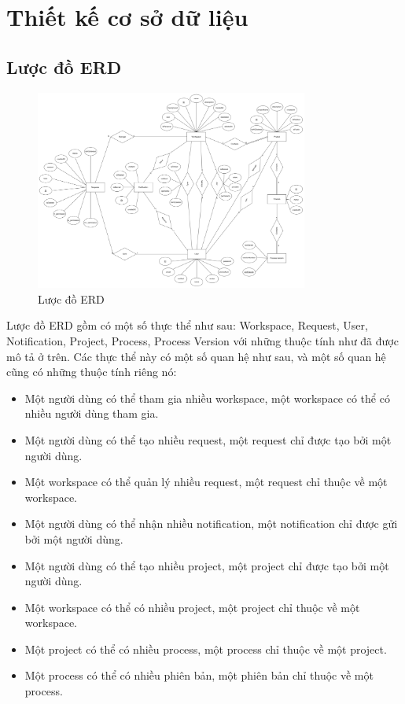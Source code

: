 \section{Thiết kế cơ sở dữ liệu}
\subsection{Lược đồ ERD}
\begin{figure}[H]
        \centering
        \includegraphics[width=0.8\textwidth]{Content/Phân tích và thiết kế hệ thống/images/erd.png}
        \vspace{0.5cm}
        \caption{Lược đồ ERD}
        \label{fig:Lược đồ ERD}
\end{figure}

\par
Lược đồ ERD gồm có một số thực thể như sau: Workspace, Request,
User, Notification, Project, Process, Process Version với những
thuộc tính như đã được mô tả ở trên. Các thực thể này có một số
quan hệ như sau, và một số quan hệ cũng có những thuộc tính riêng nó:
\begin{itemize}
    \item Một người dùng có thể tham gia nhiều workspace, một
    workspace có thể có nhiều người dùng tham gia.
    \item Một người dùng có thể tạo nhiều request, một request
    chỉ được tạo bởi một người dùng.
    \item Một workspace có thể quản lý nhiều request, một request
    chỉ thuộc về một workspace.
    \item Một người dùng có thể nhận nhiều notification, một
    notification chỉ được gửi bởi một người dùng.
    \item Một người dùng có thể tạo nhiều project, một project
    chỉ được tạo bởi một người dùng.
    \item Một workspace có thể có nhiều project, một project
    chỉ thuộc về một workspace.
    \item Một project có thể có nhiều process, một process
    chỉ thuộc về một project.
    \item Một process có thể có nhiều phiên bản, một phiên bản
    chỉ thuộc về một process.
\end{itemize}

